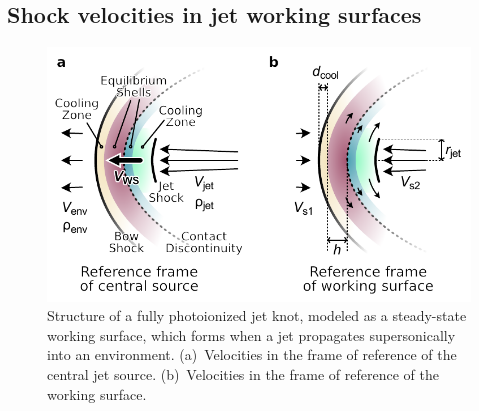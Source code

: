\documentclass[useAMS, usenatbib]{mnras}
\begin{document}
\subsection{Shock velocities in jet working surfaces}
\label{sec:shock-velocities-jet}


\begin{figure}
  \centering
  \includegraphics[width=\linewidth]{working-surface-diagram}
  \caption{
    Structure of a fully photoionized jet knot,
    modeled as a steady-state working surface,
    which forms when a jet propagates supersonically into an environment.
    (a)~Velocities in the frame of reference of the central jet source.
    (b)~Velocities in the frame of reference of the working surface.
  }
  \label{fig:working-surface}
\end{figure}
\end{document}

